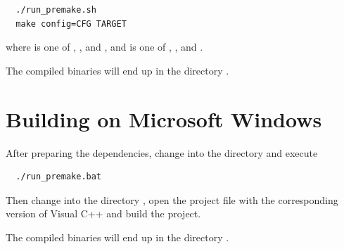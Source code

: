 \begin{verbatim}
  ./run_premake.sh
  make config=CFG TARGET
\end{verbatim}

where  is one of ,
,  and
, and  is one of
,
,
 and
.

The compiled binaries will end up in the directory .

\section{Building on Microsoft Windows}

After preparing the dependencies, change into the directory
 and execute

\begin{verbatim}
  ./run_premake.bat
\end{verbatim}

Then change into the directory , open the
project file with the corresponding version of Visual C++ and build
the project.

The compiled binaries will end up in the directory .






